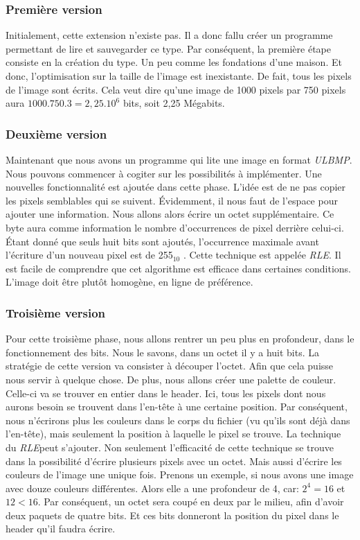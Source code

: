 \documentclass[utf8]{article}
\begin{document}
\subsubsection{Première version}
Initialement, cette extension n’existe pas. Il a donc fallu créer un programme permettant de lire et sauvegarder ce type. Par conséquent, la première étape consiste en la création du type. Un peu comme les fondations d’une maison. Et donc, l’optimisation sur la taille de l’image est inexistante. De fait, tous les pixels de l’image sont écrits. Cela veut dire qu’une image de 1000 pixels par 750 pixels aura \begin{math} 1000.750.3 = 2, 25.10^6\end{math}  bits, soit 2,25
Mégabits.

\subsubsection{Deuxième version}
Maintenant que nous avons un programme qui lite une image en format \textit{ULBMP}. Nous pouvons commencer à cogiter sur les possibilités à implémenter. Une nouvelles fonctionnalité est ajoutée dans cette phase. L’idée est de ne pas copier les pixels semblables qui se suivent. Évidemment, il nous faut de l’espace pour ajouter une information. Nous allons alors écrire un octet supplémentaire. Ce byte aura comme information le nombre d’occurrences de pixel derrière celui-ci. Étant donné que seuls huit bits sont ajoutés, l’occurrence maximale avant l’écriture d’un nouveau pixel est de 255$_{10}$ . Cette technique est appelée \textit{RLE}. Il est facile de comprendre que cet algorithme est efficace dans certaines conditions. L’image doit être plutôt homogène, en ligne de préférence. 

\subsubsection{Troisième version}
Pour cette troisième phase, nous allons rentrer un peu plus en profondeur, dans le fonctionnement des bits. Nous le savons, dans un octet il y a huit bits. La stratégie de cette version va consister à découper l’octet. Afin que cela puisse nous servir à quelque chose. De plus, nous allons créer une palette de couleur. Celle-ci va se trouver en entier dans le header. Ici, tous les pixels dont nous aurons besoin se trouvent dans l’en-tête à une certaine position. Par conséquent, nous n’écrirons plus les couleurs dans le corps du fichier (vu qu’ils sont déjà dans l’en-tête), mais seulement la position à laquelle le pixel se trouve. La technique du \textit{RLE}peut s’ajouter. Non seulement l’efficacité de cette technique se trouve dans la possibilité d’écrire plusieurs pixels avec un octet. Mais aussi d’écrire les couleurs de l’image une unique fois. Prenons un exemple, si nous avons une image avec douze couleurs différentes. Alors elle a une profondeur de 4, car: $2^4 = 16$ et $12 < 16$. Par
conséquent, un octet sera coupé en deux par le milieu, afin d’avoir deux paquets de quatre bits. Et ces bits donneront la position du pixel dans le header qu’il faudra écrire. 
\end{document}
